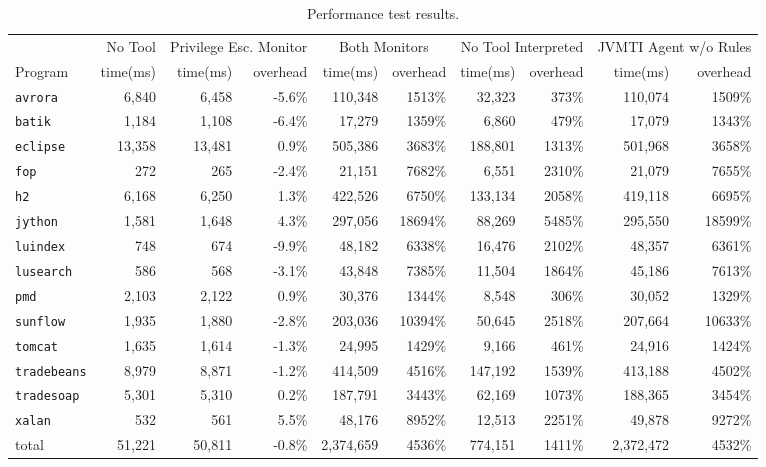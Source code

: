 \documentclass{sig-alternate}
\begin{document}
\begin{table}
\protect\caption{Performance test results.}\label{tab:Performance-Test-Results.}


\centering{}%
\begin{tabular}{lrrrrrrrrr}
\toprule 
 & No Tool & \multicolumn{2}{c}{Privilege Esc. Monitor} & \multicolumn{2}{c}{Both Monitors} & \multicolumn{2}{c}{No Tool Interpreted} & \multicolumn{2}{r}{JVMTI Agent w/o Rules}\tabularnewline
Program & time(ms) & time(ms) & overhead & time(ms) & overhead & time(ms) & overhead & time(ms) & overhead\tabularnewline
\midrule
\texttt{\footnotesize{}avrora} & 6,840 & 6,458 & -5.6\% & 110,348 & 1513\% & 32,323 & 373\% & 110,074 & 1509\%\tabularnewline
\texttt{\footnotesize{}batik} & 1,184 & 1,108 & -6.4\% & 17,279 & 1359\% & 6,860 & 479\% & 17,079 & 1343\%\tabularnewline
\texttt{\footnotesize{}eclipse} & 13,358 & 13,481 & 0.9\% & 505,386 & 3683\% & 188,801 & 1313\% & 501,968 & 3658\%\tabularnewline
\texttt{\footnotesize{}fop} & 272 & 265 & -2.4\% & 21,151 & 7682\% & 6,551 & 2310\% & 21,079 & 7655\%\tabularnewline
\texttt{\footnotesize{}h2} & 6,168 & 6,250 & 1.3\% & 422,526 & 6750\% & 133,134 & 2058\% & 419,118 & 6695\%\tabularnewline
\texttt{\footnotesize{}jython} & 1,581 & 1,648 & 4.3\% & 297,056 & 18694\% & 88,269 & 5485\% & 295,550 & 18599\%\tabularnewline
\texttt{\footnotesize{}luindex} & 748 & 674 & -9.9\% & 48,182 & 6338\% & 16,476 & 2102\% & 48,357 & 6361\%\tabularnewline
\texttt{\footnotesize{}lusearch} & 586 & 568 & -3.1\% & 43,848 & 7385\% & 11,504 & 1864\% & 45,186 & 7613\%\tabularnewline
\texttt{\footnotesize{}pmd} & 2,103 & 2,122 & 0.9\% & 30,376 & 1344\% & 8,548 & 306\% & 30,052 & 1329\%\tabularnewline
\texttt{\footnotesize{}sunflow} & 1,935 & 1,880 & -2.8\% & 203,036 & 10394\% & 50,645 & 2518\% & 207,664 & 10633\%\tabularnewline
\texttt{\footnotesize{}tomcat} & 1,635 & 1,614 & -1.3\% & 24,995 & 1429\% & 9,166 & 461\% & 24,916 & 1424\%\tabularnewline
\texttt{\footnotesize{}tradebeans} & 8,979 & 8,871 & -1.2\% & 414,509 & 4516\% & 147,192 & 1539\% & 413,188 & 4502\%\tabularnewline
\texttt{\footnotesize{}tradesoap} & 5,301 & 5,310 & 0.2\% & 187,791 & 3443\% & 62,169 & 1073\% & 188,365 & 3454\%\tabularnewline
\texttt{\footnotesize{}xalan} & 532 & 561 & 5.5\% & 48,176 & 8952\% & 12,513 & 2251\% & 49,878 & 9272\%\tabularnewline
\midrule
total & 51,221 & 50,811 & -0.8\% & 2,374,659 & 4536\% & 774,151 & 1411\% & 2,372,472 & 4532\%\tabularnewline
\bottomrule
\end{tabular}
\end{table}
\end{document}
